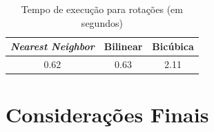 \documentclass[12pt]{article}
\begin{document}
\begin{table}[H]
\centering
\begin{tabular}{c|c|c}
 \textit{Nearest Neighbor} & Bilinear & Bicúbica  \\
 \hline
 0.62 & 0.63 & 2.11
\end{tabular}
\caption{Tempo de execução para rotações (em segundos)}
\label{tab:rotacoes}
\end{table}

\section{Considerações Finais}

\printbibliography
\end{document}
